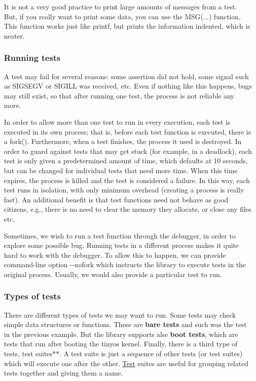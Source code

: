 It is not a very good practice to print large amounts of messages from a test. But, if you really want to print some data, you can use the {\ttfamily M\-S\-G}(...) function. This function works just like {\ttfamily printf}, but prints the information indented, which is neater.

\subsubsection*{Running tests }

A test may fail for several reasons\-: some assertion did not hold, some signal such as {\ttfamily S\-I\-G\-S\-E\-G\-V} or {\ttfamily S\-I\-G\-I\-L\-L} was received, etc. Even if nothing like this happens, bugs may still exist, so that after running one test, the process is not reliable any more.

In order to allow more than one test to run in every execution, each test is executed in its own process; that is, before each test function is executed, there is a fork(). Furthermore, when a test finishes, the process it used is destroyed. In order to guard against tests that may get stuck (for example, in a deadlock), each test is only given a predetermined amount of time, which defaults at 10 seconds, but can be changed for individual tests that need more time. When this time expires, the process is killed and the test is considered a failure. In this way, each test runs in isolation, with only minimum overhead (creating a process is really fast). An additional benefit is that test functions need not behave as good citizens, e.\-g., there is no need to clear the memory they allocate, or close any files etc.

Sometimes, we wish to run a test function through the debugger, in order to explore some possible bug. Running tests in a different process makes it quite hard to work with the debugger. To allow this to happen, we can provide command-\/line option {\ttfamily -\/-\/nofork} which instructs the library to execute tests in the original process. Usually, we would also provide a particular test to run.

\subsubsection*{Types of tests }

There are different types of tests we may want to run. Some tests may check simple data structures or functions. These are {\bfseries bare tests} and such was the test in the previous example. But the library supports alse {\bfseries boot tests}, which are tests that run after booting the tinyos kernel. Finally, there is a third type of tests, test suites$\ast$$\ast$. A test suite is just a sequence of other tests (or test suites) which will execute one after the other. \hyperlink{structTest}{Test} suites are useful for grouping related tests together and giving them a name.


